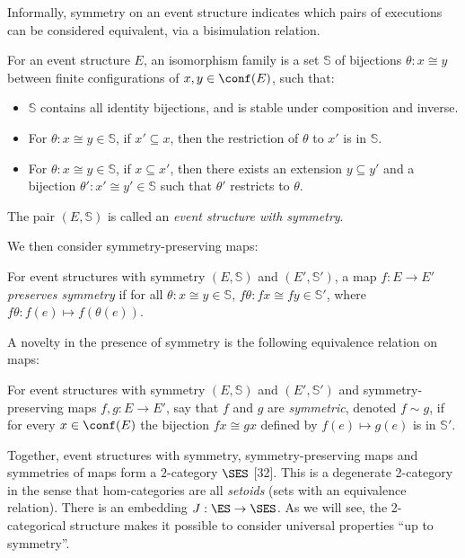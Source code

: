 \label{subsec:sem-def}
 Informally, symmetry on an event structure indicates which pairs of executions can be considered equivalent, via a bisimulation relation. 
\begin{definition}
    For an event structure $E$, an isomorphism family  is a set $\mathbb{S}$ of bijections $\theta:x \cong y$ between finite configurations of $x, y \in \conf(E)$, such that:
    \begin{itemize}
        \item $\mathbb{S}$ contains all identity bijections, and is stable under composition and inverse.  
        \item For $\theta : x \cong y \in \mathbb{S}$, if $x' \subseteq x$, then the restriction of $\theta$ to $x'$ is in $\mathbb{S}$.
        \item For $\theta : x \cong y \in \mathbb{S}$, if $x \subseteq x'$, then there exists an extension $y \subseteq y'$ and a bijection $\theta' : x' \cong y' \in \mathbb{S}$ such that $\theta'$ restricts to $\theta$.
    \end{itemize}
    The pair $(E, \mathbb{S})$ is called an \emph{event structure with symmetry}.
\end{definition}

We then consider symmetry-preserving maps:
\begin{definition}
    For event structures with symmetry $(E,\mathbb{S})$ and $(E', \mathbb{S}')$, a map $f : E \rightarrow E'$ \emph{preserves symmetry} if for all $\theta : x \cong y \in \mathbb{S}$, $f \theta : fx \cong fy \in \mathbb{S}'$, where $f\theta : f(e) \mapsto f(\theta(e))$.
\end{definition}
A novelty in the presence of symmetry is the following equivalence relation on maps:
\begin{definition}
    For event structures with symmetry $(E,\mathbb{S})$ and $(E', \mathbb{S}')$ and symmetry-preserving maps $f, g : E \rightarrow E'$, say that $f$ and $g$ are \emph{symmetric}, denoted $f \sim g$, if for every $x \in \conf(E)$ the bijection $fx \cong gx$ defined by $ f(e) \mapsto g(e)$ is in $\mathbb{S}'$.
\end{definition}
Together, event structures with symmetry, symmetry-preserving maps and symmetries of maps form a $2$-category $\SES$ [32]. This is a degenerate 2-category in the sense that hom-categories are all \emph{setoids} (sets with an equivalence relation). There is an embedding $J : \ES \to \SES$. As we will see, the 2-categorical structure makes it possible to consider universal properties ``up to symmetry''.

